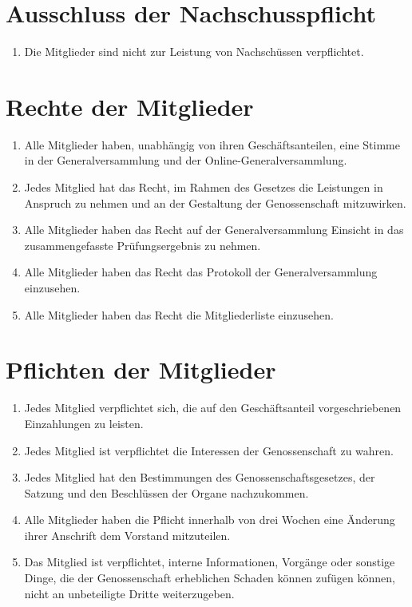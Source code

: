 \documentclass[a4paper, 12pt]{scrartcl}
\begin{document}
\section{Ausschluss der Nachschusspflicht}
\begin{enumerate}
  \item Die Mitglieder sind nicht zur Leistung von Nachschüssen verpflichtet.
\end{enumerate}

\section{Rechte der Mitglieder}
\begin{enumerate}
  \item Alle Mitglieder haben, unabhängig von ihren Geschäftsanteilen, eine Stimme in der Generalversammlung und der Online-Generalversammlung.
  \item Jedes Mitglied hat das Recht, im Rahmen des Gesetzes die Leistungen in Anspruch zu nehmen und an der Gestaltung der Genossenschaft mitzuwirken.
  \item Alle Mitglieder haben das Recht auf der Generalversammlung Einsicht in das zusammengefasste Prüfungsergebnis zu nehmen.
  \item Alle Mitglieder haben das Recht das Protokoll der Generalversammlung einzusehen.
  \item Alle Mitglieder haben das Recht die Mitgliederliste einzusehen.
\end{enumerate}

\section{Pflichten der Mitglieder}
\begin{enumerate}
  \item Jedes Mitglied verpflichtet sich, die auf den Geschäftsanteil vorgeschriebenen Einzahlungen zu leisten.
  \item Jedes Mitglied ist verpflichtet die Interessen der Genossenschaft zu wahren.
  \item Jedes Mitglied hat den Bestimmungen des Genossenschaftsgesetzes, der Satzung und den Beschlüssen der Organe nachzukommen.
  \item Alle Mitglieder haben die Pflicht innerhalb von drei Wochen eine Änderung ihrer Anschrift dem Vorstand mitzuteilen.
  \item Das Mitglied ist verpflichtet, interne Informationen, Vorgänge oder sonstige Dinge, die der Genossenschaft erheblichen Schaden können zufügen können, nicht an unbeteiligte Dritte weiterzugeben.
\end{enumerate}
\end{document}
